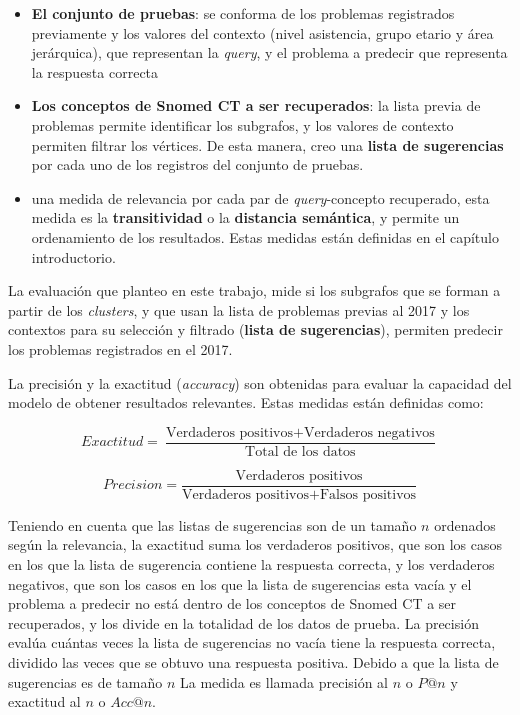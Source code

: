 \begin{itemize}
\item \textbf{El conjunto de pruebas}: se conforma de los problemas registrados previamente y los valores del contexto (nivel asistencia, grupo etario y área jerárquica), que representan la \textit{query}, y el problema a predecir que representa la respuesta correcta
\item \textbf{Los conceptos de Snomed CT a ser recuperados}: la lista previa de problemas permite identificar los subgrafos, y los valores de contexto permiten filtrar los vértices. De esta manera, creo una \textbf{lista de sugerencias} por cada uno de los registros del conjunto de pruebas.
\item una medida de relevancia por cada par de \textit{query}-concepto recuperado, esta medida es la \textbf{transitividad} o la \textbf{distancia semántica}, y permite un ordenamiento de los resultados. Estas medidas están definidas en el capítulo introductorio.
\end{itemize}

La evaluación que planteo en este trabajo, mide si los subgrafos que se forman a partir de los \textit{clusters}, y que usan la lista de problemas previas al 2017 y los contextos para su selección y filtrado (\textbf{lista de sugerencias}), permiten predecir los problemas registrados en el 2017.

La precisión y la exactitud (\textit{accuracy}) son obtenidas para evaluar la capacidad del modelo de obtener resultados relevantes. Estas medidas están definidas como:

\begin{equation}
Exactitud = \frac{\text{Verdaderos positivos}+\text{Verdaderos negativos}}{\text{Total de los datos}}
\end{equation}

\begin{equation}
Precision = \frac{\text{Verdaderos positivos}}{\text{Verdaderos positivos}+\text{Falsos positivos}}
\end{equation}

Teniendo en cuenta que las listas de sugerencias son de un tamaño $n$ ordenados según la relevancia, la exactitud suma los verdaderos positivos, que son los casos en los que la lista de sugerencia contiene la respuesta correcta, y los verdaderos negativos, que son los casos en los que la lista de sugerencias esta vacía y el problema a predecir no está dentro de los conceptos de Snomed CT a ser recuperados, y los divide en la totalidad de los datos de prueba. La precisión evalúa cuántas veces la lista de sugerencias no vacía tiene la respuesta correcta, dividido las veces que se obtuvo una respuesta positiva. Debido a que la lista de sugerencias es de tamaño $n$ La medida es llamada precisión al $n$ o $P@n$ y exactitud al $n$ o $Acc@n$.






